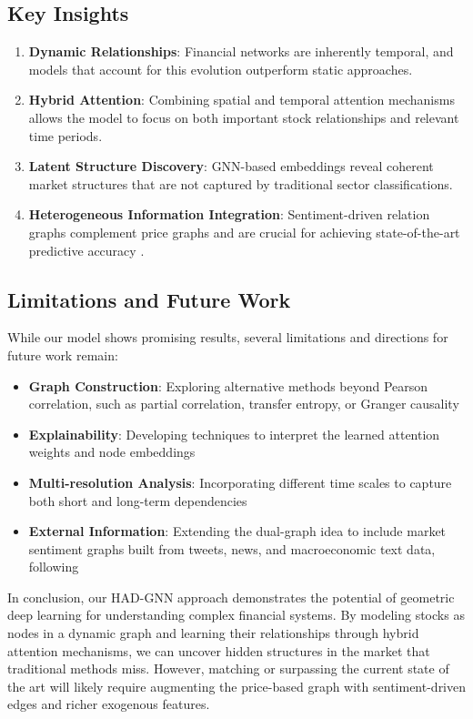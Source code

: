 \documentclass[12pt]{article}
\begin{document}
\subsection{Key Insights}

\begin{enumerate}
    \item \textbf{Dynamic Relationships}: Financial networks are inherently temporal, and models that account for this evolution outperform static approaches.
    \item \textbf{Hybrid Attention}: Combining spatial and temporal attention mechanisms allows the model to focus on both important stock relationships and relevant time periods.
    \item \textbf{Latent Structure Discovery}: GNN-based embeddings reveal coherent market structures that are not captured by traditional sector classifications.
    \item \textbf{Heterogeneous Information Integration}: Sentiment-driven relation graphs complement price graphs and are crucial for achieving state-of-the-art predictive accuracy \cite{zhang2024,liu2025}.
\end{enumerate}

\subsection{Limitations and Future Work}

While our model shows promising results, several limitations and directions for future work remain:

\begin{itemize}
    \item \textbf{Graph Construction}: Exploring alternative methods beyond Pearson correlation, such as partial correlation, transfer entropy, or Granger causality
    \item \textbf{Explainability}: Developing techniques to interpret the learned attention weights and node embeddings
    \item \textbf{Multi-resolution Analysis}: Incorporating different time scales to capture both short and long-term dependencies
    \item \textbf{External Information}: Extending the dual-graph idea to include market sentiment graphs built from tweets, news, and macroeconomic text data, following \cite{du2023,zhang2024,liu2025}
\end{itemize}

In conclusion, our HAD-GNN approach demonstrates the potential of geometric deep learning for understanding complex financial systems. By modeling stocks as nodes in a dynamic graph and learning their relationships through hybrid attention mechanisms, we can uncover hidden structures in the market that traditional methods miss. However, matching or surpassing the current state of the art will likely require augmenting the price-based graph with sentiment-driven edges and richer exogenous features.
\end{document}
